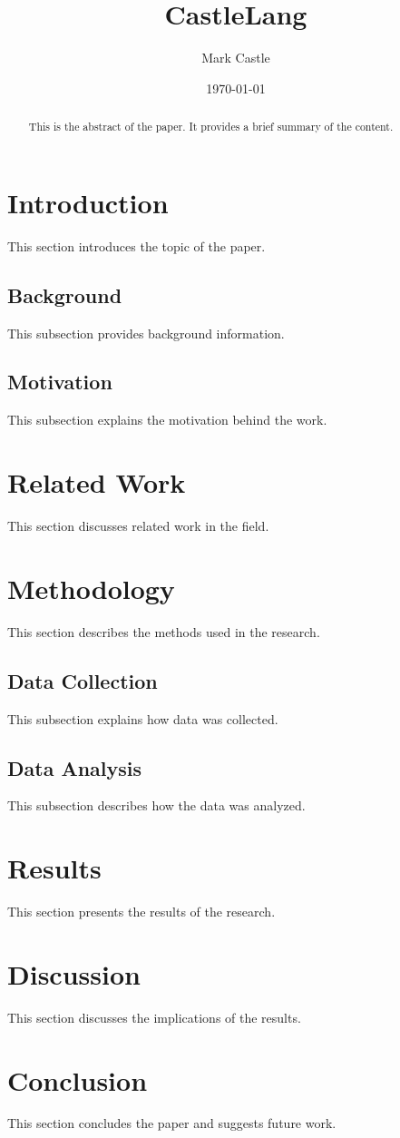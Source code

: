 \documentclass{article}
\title{CastleLang}
\author{Mark Castle}
\date{\today}
\begin{document}
\maketitle

\begin{abstract}
This is the abstract of the paper. It provides a brief summary of the content.
\end{abstract}

\section{Introduction}
This section introduces the topic of the paper.

\subsection{Background}
This subsection provides background information.

\subsection{Motivation}
This subsection explains the motivation behind the work.

\section{Related Work}
This section discusses related work in the field.

\section{Methodology}
This section describes the methods used in the research.

\subsection{Data Collection}
This subsection explains how data was collected.

\subsection{Data Analysis}
This subsection describes how the data was analyzed.

\section{Results}
This section presents the results of the research.

\section{Discussion}
This section discusses the implications of the results.

\section{Conclusion}
This section concludes the paper and suggests future work.
\end{document}
